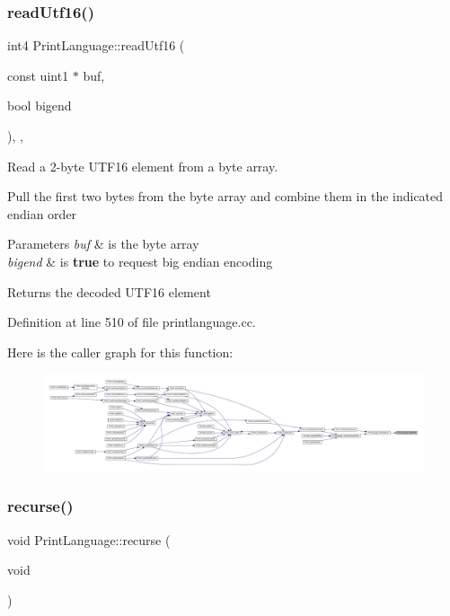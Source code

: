 \subsubsection{\texorpdfstring{readUtf16()}{readUtf16()}}
{\footnotesize\ttfamily int4 Print\+Language\+::read\+Utf16 (\begin{DoxyParamCaption}\item[{const uint1 $\ast$}]{buf,  }\item[{bool}]{bigend }\end{DoxyParamCaption})\hspace{0.3cm}{\ttfamily [inline]}, {\ttfamily [static]}, {\ttfamily [protected]}}



Read a 2-\/byte U\+T\+F16 element from a byte array. 

Pull the first two bytes from the byte array and combine them in the indicated endian order 
\begin{DoxyParams}{Parameters}
{\em buf} & is the byte array \\
\hline
{\em bigend} & is {\bfseries{true}} to request big endian encoding \\
\hline
\end{DoxyParams}
\begin{DoxyReturn}{Returns}
the decoded U\+T\+F16 element 
\end{DoxyReturn}


Definition at line 510 of file printlanguage.\+cc.

Here is the caller graph for this function\+:
\nopagebreak
\begin{figure}[H]
\begin{center}
\leavevmode
\includegraphics[width=350pt]{class_print_language_a787cce79247f1e1df842aeb7de8fb7f2_icgraph}
\end{center}
\end{figure}
\mbox{\label{class_print_language_a193f787ccd9f5466a7b97feb084687d6}} 
\subsubsection{\texorpdfstring{recurse()}{recurse()}}
{\footnotesize\ttfamily void Print\+Language\+::recurse (\begin{DoxyParamCaption}\item[{void}]{ }\end{DoxyParamCaption})\hspace{0.3cm}{\ttfamily [protected]}}



